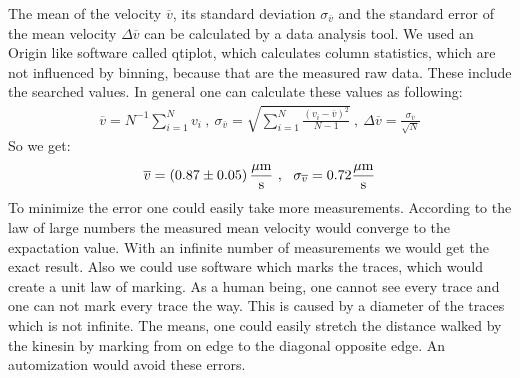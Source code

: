         \vspace{2mm}
        The mean of the velocity $\overline v$, its standard deviation $\sigma_{\overline v}$ and the standard error of the mean velocity $\Delta \overline v$ can be calculated by a data analysis tool. We used an Origin like software called qtiplot, which calculates column statistics, which are not influenced by binning, because that are the measured raw data. These include the searched values.
        In general one can calculate these values as following:
        \begin{eqnarray*}
            \overline v = N^{-1} \sum_{i = 1}^{N}v_i\ ,\ \sigma_{\overline v} = \sqrt{\sum_{i = 1}^{N} \frac{(v_i - \overline v)^2}{N-1}}\ , \ \Delta \overline v = \frac{\sigma_{\overline v}}{\sqrt{N}}
        \end{eqnarray*}
        So we get:
        $$ \overline v = \unit[(0.87 \pm 0.05)]{\frac{\mu m}{s}}\ , \ \ \sigma_{\overline v} = 0.72 \unit{\frac{\mu m}{s}}$$
        To minimize the error one could easily take more measurements. According to the law of large numbers the measured mean velocity would converge to the expactation value. With an infinite number of measurements we would get the exact result. 
        Also we could use software which marks the traces, which would create a unit law of marking. As a human being, one cannot see every trace and one can not mark every trace the way. This is caused by a diameter of the traces which is not infinite. The means, one could easily stretch the distance walked by the kinesin by marking from on edge to the diagonal opposite edge. An automization would avoid these errors. 
    
